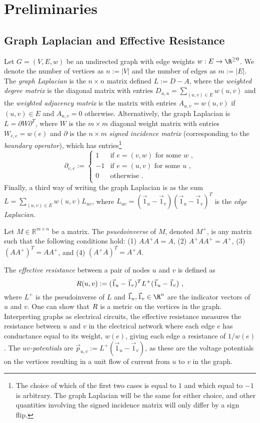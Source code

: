 \section{Preliminaries}
\label{sec:prelims}

\subsection{Graph Laplacian and Effective Resistance}
Let $G=(V, E, w)$ be an undirected 
graph with edge weights
$w:E\rightarrow \R^{\geq 0}$. We denote the number of vertices as $n:=|V|$ and the number of edges as $m:=|E|$. The \emph{graph Laplacian} is the $n \times n$ matrix defined $L := D - A$, where the \emph{weighted degree matrix} is the diagonal matrix with entries $D_{u,u} = \sum_{(u,v)\in E}{w(u,v)}$ and the \emph{weighted adjacency matrix} is the matrix with entries $A_{u,v} = w(u,v)$ if $(u,v)\in E$ and $A_{u,v}=0$ otherwise.
Alternatively, the graph Laplacian is $L = \partial W\partial^{T}$, where $W$ is the $m \times m$ diagonal weight matrix with entries $W_{e,e} = w(e)$ and $\partial$ is the $n \times m$ \emph{signed incidence matrix} (corresponding to the \emph{boundary operator}), which has  entries\footnote{The choice of which of the first two cases is equal to $1$ and which equal to $-1$ is arbitrary. The graph Laplacian will be the same for either choice, and other quantities involving the signed incidence matrix will only differ by a sign flip.}
\[
\partial_{v, e} := \begin{cases}
1 & \text{if $e = (v, w)$ for some $w$ ,} \\
-1 & \text{if $e = (u, v)$ for some $u$ ,} \\
0 & \text{otherwise .} \\
\end{cases}
\]
Finally, a third way of writing the graph Laplacian is as the sum $L = \sum_{(u,v)\in E} w(u,v)L_{uv}$, where $L_{uv} = (\vec{1}_{u} - \vec{1}_{v})(\vec{1}_{u} - \vec{1}_{v})^{T}$ is the \emph{edge Laplacian}.

    Let $M \in \mathbb{R}^{m \times n}$ be a matrix.
    The \emph{psuedoinverse} of $M$, denoted $M^+$, is any matrix such that the following conditions hold:
    (1) $AA^+A=A$,
    (2) $A^+AA^+=A^+$,
    (3) $(AA^+)^T=AA^+$, and 
    (4) $(A^+A)^T=A^+A$.
    

The \emph{effective resistance} between a pair of nodes $u$ and $v$ is defined as
\begin{equation} \label{eq:eff_res_def}
\res(u,v) := (\vec{1}_u - \vec{1}_v)^{T} L^{+} (\vec{1}_u-\vec{1}_v) \ \text{,}
\end{equation}
where $L^{+}$ is the pseudoinverse of $L$ and $\vec{1}_u,\vec{1}_v \in \R^n$ are the indicator vectors of $u$ and $v$. One can show that $R$ is a metric on the vertices in the graph.
Interpreting graphs as electrical circuits, the effective resistance measures the resistance between $u$ and $v$ in the electrical network where each edge $e$ has conductance equal to its weight, $w(e)$, giving each edge a resistance of $1/w(e)$. %
The \emph{$uv$-potentials} are $\Vec{p}_{u,v} := L^{+} (\vec{1}_u-\vec{1}_v)$, as these are the voltage potentials on the vertices resulting in a unit flow of current from $u$ to $v$ in the graph.

